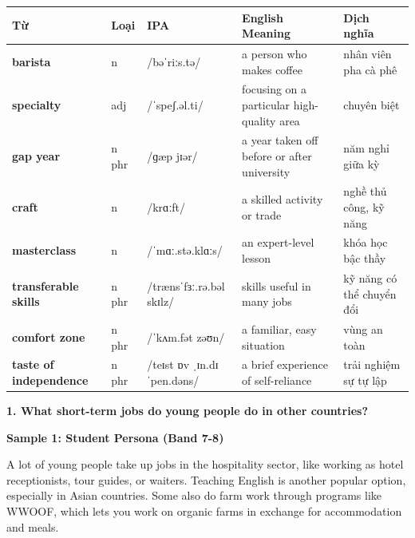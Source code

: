 \vspace{0.8em}
\begin{center}
\renewcommand{\arraystretch}{1.65}
\begin{tabularx}{\textwidth}{|V{0.22\textwidth}|C{0.07\textwidth}|I{0.20\textwidth}|Y|V{0.18\textwidth}|}
\hline
{}
\textbf{Từ} & \textbf{Loại} & \textbf{IPA} & \textbf{English Meaning} & \textbf{Dịch nghĩa} \\
\hline
\textbf{barista} & n & /bəˈriːs.tə/ & a person who makes coffee & nhân viên pha cà phê \\ \hline
\textbf{specialty} & adj & /ˈspeʃ.əl.ti/ & focusing on a particular high-quality area & chuyên biệt \\ \hline
\textbf{gap year} & n phr & /ɡæp jɪər/ & a year taken off before or after university & năm nghỉ giữa kỳ \\ \hline
\textbf{craft} & n & /krɑːft/ & a skilled activity or trade & nghề thủ công, kỹ năng \\ \hline
\textbf{masterclass} & n & /ˈmɑː.stə.klɑːs/ & an expert-level lesson & khóa học bậc thầy \\ \hline
\textbf{transferable skills} & n phr & /trænsˈfɜː.rə.bəl skɪlz/ & skills useful in many jobs & kỹ năng có thể chuyển đổi \\ \hline
\textbf{comfort zone} & n phr & /ˈkʌm.fət zəʊn/ & a familiar, easy situation & vùng an toàn \\ \hline
\textbf{taste of independence} & n phr & /teɪst ɒv ˌɪn.dɪˈpen.dəns/ & a brief experience of self-reliance & trải nghiệm sự tự lập \\ \hline
\end{tabularx}
\end{center}

\partthreeheader

\begin{ieltsquestion}
\textbf{1. What short-term jobs do young people do in other countries?}
\end{ieltsquestion}
\textbf{Sample 1: Student Persona (Band 7-8)}

A lot of young people take up jobs in the hospitality sector, like working as hotel receptionists, tour guides, or waiters. Teaching English is another popular option, especially in Asian countries. Some also do farm work through programs like WWOOF, which lets you work on organic farms in exchange for accommodation and meals.

\separator

